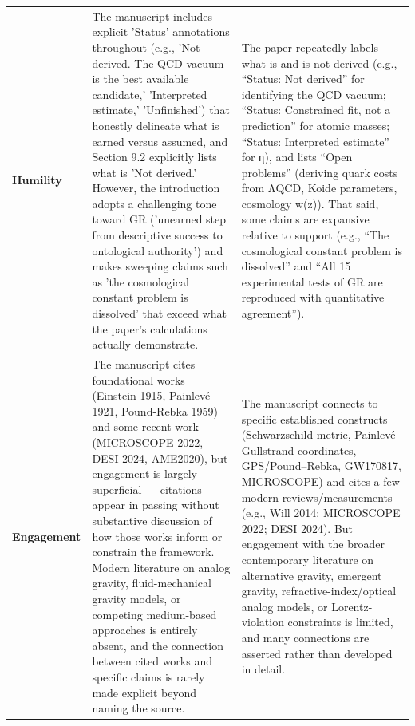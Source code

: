 \documentclass[11pt]{article}
\begin{document}
\begin{longtable}{@{} p{2.2cm} p{6.3cm} p{6.3cm} @{}}
\rowcolor{rowgray}
\textbf{Humility} &
The manuscript includes explicit 'Status' annotations throughout (e.g., 'Not derived. The QCD vacuum is the best available candidate,' 'Interpreted estimate,' 'Unfinished') that honestly delineate what is earned versus assumed, and Section 9.2 explicitly lists what is 'Not derived.' However, the introduction adopts a challenging tone toward GR ('unearned step from descriptive success to ontological authority') and makes sweeping claims such as 'the cosmological constant problem is dissolved' that exceed what the paper's calculations actually demonstrate. &
The paper repeatedly labels what is and is not derived (e.g., “Status: Not derived” for identifying the QCD vacuum; “Status: Constrained fit, not a prediction” for atomic masses; “Status: Interpreted estimate” for η), and lists “Open problems” (deriving quark costs from ΛQCD, Koide parameters, cosmology w(z)). That said, some claims are expansive relative to support (e.g., “The cosmological constant problem is dissolved” and “All 15 experimental tests of GR are reproduced with quantitative agreement”). \\[6pt]

\textbf{Engagement} &
The manuscript cites foundational works (Einstein 1915, Painlevé 1921, Pound-Rebka 1959) and some recent work (MICROSCOPE 2022, DESI 2024, AME2020), but engagement is largely superficial — citations appear in passing without substantive discussion of how those works inform or constrain the framework. Modern literature on analog gravity, fluid-mechanical gravity models, or competing medium-based approaches is entirely absent, and the connection between cited works and specific claims is rarely made explicit beyond naming the source. &
The manuscript connects to specific established constructs (Schwarzschild metric, Painlevé–Gullstrand coordinates, GPS/Pound–Rebka, GW170817, MICROSCOPE) and cites a few modern reviews/measurements (e.g., Will 2014; MICROSCOPE 2022; DESI 2024). But engagement with the broader contemporary literature on alternative gravity, emergent gravity, refractive-index/optical analog models, or Lorentz-violation constraints is limited, and many connections are asserted rather than developed in detail. \\[6pt]


\end{longtable}
\end{document}
